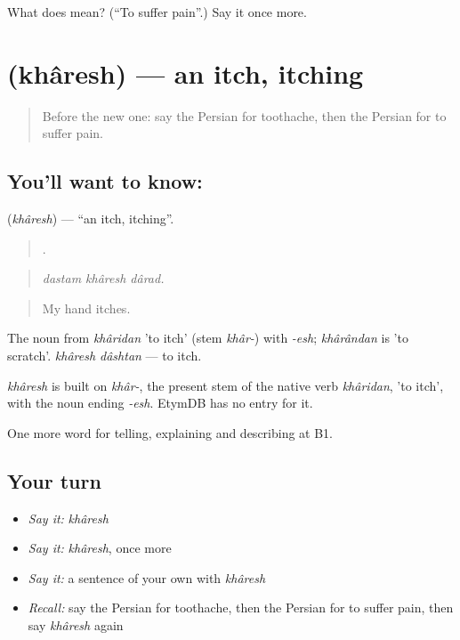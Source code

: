 \begin{tcolorbox}[breakable,colback=teal!4,colframe=teal!35!black,title={Before you move on}]
What does   mean? (\textquotedblleft{}To suffer pain\textquotedblright{}.) Say it once more.
\end{tcolorbox}
\section[\texorpdfstring{\fa{خارش} (khâresh)}{خارش (khâresh)}]{ (khâresh) — an itch, itching}

\label{lesson:FA-C491-kharesh}



\begin{quote}
Before the new one: say the Persian for toothache, then the Persian for to suffer pain.
\end{quote}

\subsection*{You'll want to know: }
\textbf{} (\emph{khâresh}) — \textquotedblleft{}an itch, itching\textquotedblright{}.

\begin{quote}
  .
\end{quote}

\begin{quote}
\emph{dastam khâresh dârad.}
\end{quote}

\begin{quote}
My hand itches.
\end{quote}

The noun from \emph{khâridan} 'to itch' (stem \emph{khâr-}) with \emph{-esh}; \emph{khârândan} is 'to scratch'. \emph{khâresh dâshtan} — to itch.

\begin{cousinweb}
\emph{khâresh} is built on \emph{khâr-}, the present stem of the native verb \emph{khâridan}, 'to itch', with the noun ending \emph{-esh}. EtymDB has no entry for it.
\end{cousinweb}

\begin{grammarlens}[title={What you've built}]
One more word for telling, explaining and describing at B1.
\end{grammarlens}

\subsection*{Your turn}
\begin{itemize}
\raggedright
  \item \emph{Say it:} \emph{khâresh}
  \item \emph{Say it:} \emph{khâresh}, once more
  \item \emph{Say it:} a sentence of your own with \emph{khâresh}
  \item \emph{Recall:} say the Persian for toothache, then the Persian for to suffer pain, then say \emph{khâresh} again
\end{itemize}

